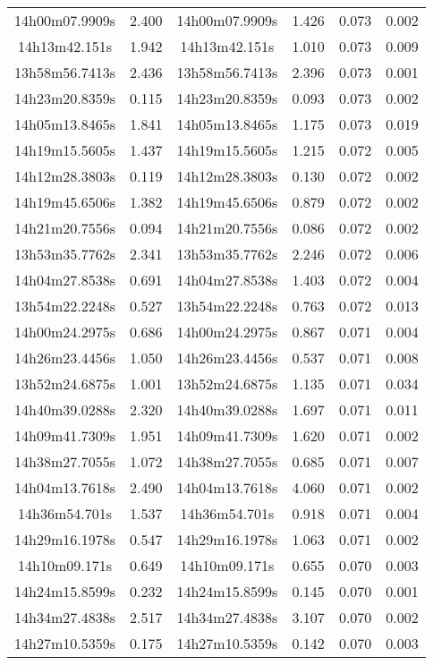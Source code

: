 \begin{table}
\begin{tabular}{cccccc}
14h00m07.9909s & 2.400 & 14h00m07.9909s & 1.426 & 0.073 & 0.002 \\
14h13m42.151s & 1.942 & 14h13m42.151s & 1.010 & 0.073 & 0.009 \\
13h58m56.7413s & 2.436 & 13h58m56.7413s & 2.396 & 0.073 & 0.001 \\
14h23m20.8359s & 0.115 & 14h23m20.8359s & 0.093 & 0.073 & 0.002 \\
14h05m13.8465s & 1.841 & 14h05m13.8465s & 1.175 & 0.073 & 0.019 \\
14h19m15.5605s & 1.437 & 14h19m15.5605s & 1.215 & 0.072 & 0.005 \\
14h12m28.3803s & 0.119 & 14h12m28.3803s & 0.130 & 0.072 & 0.002 \\
14h19m45.6506s & 1.382 & 14h19m45.6506s & 0.879 & 0.072 & 0.002 \\
14h21m20.7556s & 0.094 & 14h21m20.7556s & 0.086 & 0.072 & 0.002 \\
13h53m35.7762s & 2.341 & 13h53m35.7762s & 2.246 & 0.072 & 0.006 \\
14h04m27.8538s & 0.691 & 14h04m27.8538s & 1.403 & 0.072 & 0.004 \\
13h54m22.2248s & 0.527 & 13h54m22.2248s & 0.763 & 0.072 & 0.013 \\
14h00m24.2975s & 0.686 & 14h00m24.2975s & 0.867 & 0.071 & 0.004 \\
14h26m23.4456s & 1.050 & 14h26m23.4456s & 0.537 & 0.071 & 0.008 \\
13h52m24.6875s & 1.001 & 13h52m24.6875s & 1.135 & 0.071 & 0.034 \\
14h40m39.0288s & 2.320 & 14h40m39.0288s & 1.697 & 0.071 & 0.011 \\
14h09m41.7309s & 1.951 & 14h09m41.7309s & 1.620 & 0.071 & 0.002 \\
14h38m27.7055s & 1.072 & 14h38m27.7055s & 0.685 & 0.071 & 0.007 \\
14h04m13.7618s & 2.490 & 14h04m13.7618s & 4.060 & 0.071 & 0.002 \\
14h36m54.701s & 1.537 & 14h36m54.701s & 0.918 & 0.071 & 0.004 \\
14h29m16.1978s & 0.547 & 14h29m16.1978s & 1.063 & 0.071 & 0.002 \\
14h10m09.171s & 0.649 & 14h10m09.171s & 0.655 & 0.070 & 0.003 \\
14h24m15.8599s & 0.232 & 14h24m15.8599s & 0.145 & 0.070 & 0.001 \\
14h34m27.4838s & 2.517 & 14h34m27.4838s & 3.107 & 0.070 & 0.002 \\
14h27m10.5359s & 0.175 & 14h27m10.5359s & 0.142 & 0.070 & 0.003 \\

\end{tabular}
\end{table}
